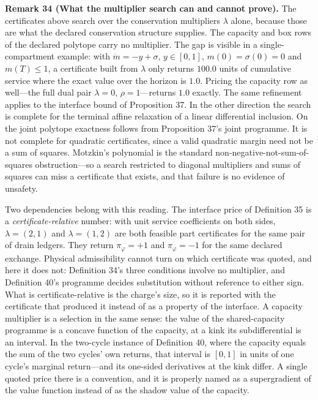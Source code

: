 \documentclass[11pt]{article}
\begin{document}
\textbf{Remark 34 (What the multiplier search can and cannot prove).} The certificates above search over the conservation multipliers \(\lambda\) alone, because those are what the declared conservation structure supplies. The capacity and box rows of the declared polytope carry no multiplier. The gap is visible in a single-compartment example: with \(\dot m = -y + \sigma\), \(y \in [0, 1]\), \(m(0) = \sigma(0) = 0\) and \(m(T) \le 1\), a certificate built from \(\lambda\) only returns \(100.0\) units of cumulative service where the exact value over the horizon is \(1.0\). Pricing the capacity row as well---the full dual pair \(\lambda = 0\), \(\rho = 1\)---returns \(1.0\) exactly. The same refinement applies to the interface bound of Proposition 37. In the other direction the search is complete for the terminal affine relaxation of a linear differential inclusion. On the joint polytope exactness follows from Proposition 37's joint programme. It is not complete for quadratic certificates, since a valid quadratic margin need not be a sum of squares. Motzkin's polynomial is the standard non-negative-not-sum-of-squares obstruction---so a search restricted to diagonal multipliers and sums of squares can miss a certificate that exists, and that failure is no evidence of unsafety.

Two dependencies belong with this reading. The interface price of Definition 35 is a \emph{certificate-relative} number: with unit service coefficients on both sides, \(\lambda = (2,1)\) and \(\lambda = (1,2)\) are both feasible part certificates for the same pair of drain ledgers. They return \(\pi_\varphi = +1\) and \(\pi_\varphi = -1\) for the same declared exchange. Physical admissibility cannot turn on which certificate was quoted, and here it does not: Definition 34's three conditions involve no multiplier, and Definition 40's programme decides substitution without reference to either sign. What is certificate-relative is the charge's size, so it is reported with the certificate that produced it instead of as a property of the interface. A capacity multiplier is a selection in the same sense: the value of the shared-capacity programme is a concave function of the capacity, at a kink its subdifferential is an interval. In the two-cycle instance of Definition 40, where the capacity equals the sum of the two cycles' own returns, that interval is \([0, 1]\) in units of one cycle's marginal return---and its one-sided derivatives at the kink differ. A single quoted price there is a convention, and it is properly named as a supergradient of the value function instead of as the shadow value of the capacity.
\end{document}
